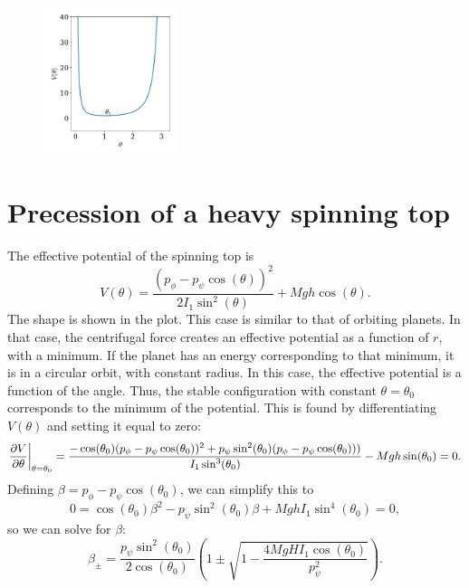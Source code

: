 \documentclass{article}
\begin{document}
        \begin{figure}
            \includegraphics[width=0.35\textwidth]{figures/exercise_3_plot.pdf}
            \vspace{-2cm}
        \end{figure}
    \section{Precession of a heavy spinning top}
        The effective potential of the spinning top is
        \begin{equation*}
            V(\theta) = \frac{\left(p_{\phi} - p_{\psi}\cos(\theta)\right)^2}{2 I_1 \sin^2(\theta)} + Mgh\cos(\theta).
        \end{equation*}
        The shape is shown in the plot. This case is similar to that of orbiting planets. In that case, the centrifugal force creates an effective potential as a function of $r$, with a minimum. If the planet has an energy corresponding to that minimum, it is in a circular orbit, with constant radius. In this case, the effective potential is a function of the angle. Thus, the stable configuration with constant $\theta = \theta_0$ corresponds to the minimum of the potential. This is found by differentiating $V(\theta)$ and setting it equal to zero:
        \begin{equation*}
            \pdv{V}{\theta} \bigg |_{\theta = \theta_0} = \frac{-\cos(\theta_0)(p_\phi - p_\psi \cos(\theta_0))^2 + p_\psi \sin^2(\theta_0)(p_\phi - p_\psi \cos(\theta_0)))}{I_1 \sin^3(\theta_0)} - Mgh \sin(\theta_0) = 0.
        \end{equation*}
        Defining $\beta = p_\phi - p_\psi \cos(\theta_0)$, we can simplify this to
        \begin{equation*}
            0 = \cos(\theta_0) \beta^2 - p_\psi \sin^2(\theta_0) \beta  + MghI_1\sin^4(\theta_0) = 0, 
        \end{equation*}
        so we can solve for $\beta$:
        \begin{equation*}
            \beta_\pm = \frac{p_\psi \sin^2(\theta_0)}{2 \cos(\theta_0)} \left( 1 \pm \sqrt{1 - \frac{4 M g H I_1 \cos(\theta_0)}{p_\psi^2}} \right).
        \end{equation*}
\end{document}
